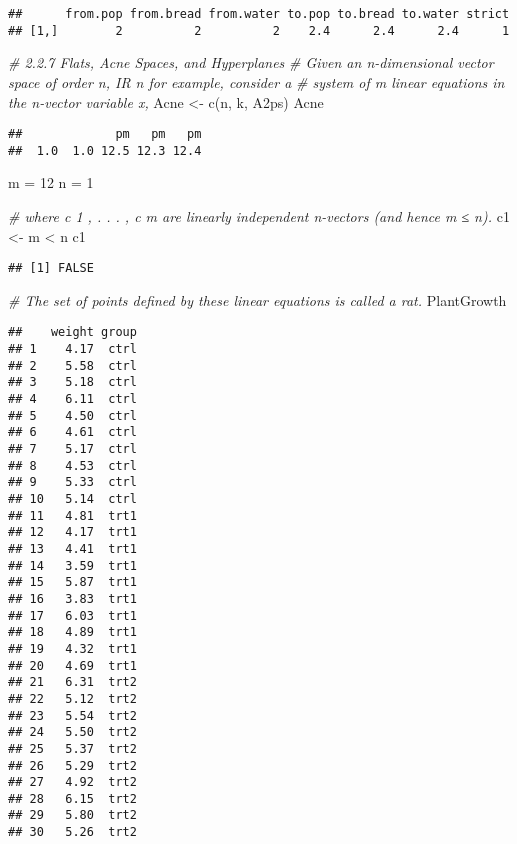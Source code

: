 \documentclass[
]{article}
\newenvironment{Shaded}{\begin{snugshade}}{\end{snugshade}}
\newcommand{\CommentTok}[1]{\textcolor[rgb]{0.56,0.35,0.01}{\textit{#1}}}
\newcommand{\DecValTok}[1]{\textcolor[rgb]{0.00,0.00,0.81}{#1}}
\newcommand{\FunctionTok}[1]{\textcolor[rgb]{0.00,0.00,0.00}{#1}}
\newcommand{\NormalTok}[1]{#1}
\newcommand{\OtherTok}[1]{\textcolor[rgb]{0.56,0.35,0.01}{#1}}
\newcommand{\SpecialCharTok}[1]{\textcolor[rgb]{0.00,0.00,0.00}{#1}}
\begin{document}
\begin{verbatim}
##      from.pop from.bread from.water to.pop to.bread to.water strict
## [1,]        2          2          2    2.4      2.4      2.4      1
\end{verbatim}

\begin{Shaded}
\begin{Highlighting}[]
\CommentTok{\# 2.2.7 Flats, Acne Spaces, and Hyperplanes}
\CommentTok{\# Given an n{-}dimensional vector space of order n, IR n for example, consider a}
\CommentTok{\# system of m linear equations in the n{-}vector variable x,}
\NormalTok{Acne }\OtherTok{\textless{}{-}} \FunctionTok{c}\NormalTok{(n, k, A2ps)}
\NormalTok{Acne}
\end{Highlighting}
\end{Shaded}

\begin{verbatim}
##             pm   pm   pm 
##  1.0  1.0 12.5 12.3 12.4
\end{verbatim}

\begin{Shaded}
\begin{Highlighting}[]
\NormalTok{m }\OtherTok{=} \DecValTok{12}
\NormalTok{n }\OtherTok{=} \DecValTok{1}

\CommentTok{\# where c 1 , . . . , c m are linearly independent n{-}vectors (and hence m ≤ n).}
\NormalTok{c1 }\OtherTok{\textless{}{-}}\NormalTok{ m }\SpecialCharTok{\textless{}}\NormalTok{ n}
\NormalTok{c1}
\end{Highlighting}
\end{Shaded}

\begin{verbatim}
## [1] FALSE
\end{verbatim}

\begin{Shaded}
\begin{Highlighting}[]
\CommentTok{\# The set of points defined by these linear equations is called a rat.}
\NormalTok{PlantGrowth}
\end{Highlighting}
\end{Shaded}

\begin{verbatim}
##    weight group
## 1    4.17  ctrl
## 2    5.58  ctrl
## 3    5.18  ctrl
## 4    6.11  ctrl
## 5    4.50  ctrl
## 6    4.61  ctrl
## 7    5.17  ctrl
## 8    4.53  ctrl
## 9    5.33  ctrl
## 10   5.14  ctrl
## 11   4.81  trt1
## 12   4.17  trt1
## 13   4.41  trt1
## 14   3.59  trt1
## 15   5.87  trt1
## 16   3.83  trt1
## 17   6.03  trt1
## 18   4.89  trt1
## 19   4.32  trt1
## 20   4.69  trt1
## 21   6.31  trt2
## 22   5.12  trt2
## 23   5.54  trt2
## 24   5.50  trt2
## 25   5.37  trt2
## 26   5.29  trt2
## 27   4.92  trt2
## 28   6.15  trt2
## 29   5.80  trt2
## 30   5.26  trt2
\end{verbatim}
\end{document}
